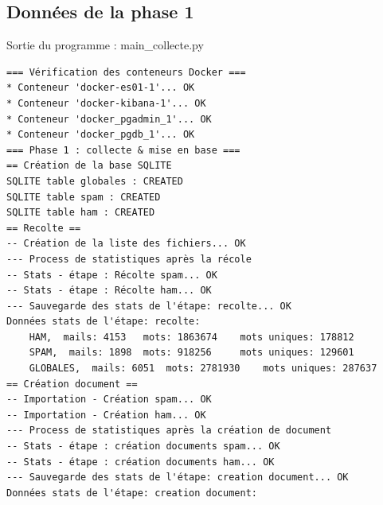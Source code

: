 \documentclass[a4paper,12pt]{article}
\begin{document}
	\subsection{Données de la phase 1}
		Sortie du programme : main\_collecte.py
		\begin{verbatim}
=== Vérification des conteneurs Docker ===
* Conteneur 'docker-es01-1'... OK
* Conteneur 'docker-kibana-1'... OK
* Conteneur 'docker_pgadmin_1'... OK
* Conteneur 'docker_pgdb_1'... OK
=== Phase 1 : collecte & mise en base ===
== Création de la base SQLITE
SQLITE table globales : CREATED
SQLITE table spam : CREATED
SQLITE table ham : CREATED
== Recolte ==
-- Création de la liste des fichiers... OK
--- Process de statistiques après la récole
-- Stats - étape : Récolte spam... OK                                                                                                                                                                                                         
-- Stats - étape : Récolte ham... OK                                                                                                                                                                                                          
--- Sauvegarde des stats de l'étape: recolte... OK
Données stats de l'étape: recolte:
	HAM,  mails: 4153 	mots: 1863674	 mots uniques: 178812
	SPAM,  mails: 1898 	mots: 918256	 mots uniques: 129601
	GLOBALES,  mails: 6051 	mots: 2781930	 mots uniques: 287637
== Création document ==
-- Importation - Création spam... OK                                                                                                                                                                                                          
-- Importation - Création ham... OK                                                                                                                                                                                                           
--- Process de statistiques après la création de document
-- Stats - étape : création documents spam... OK                                                                                                                                                                                              
-- Stats - étape : création documents ham... OK                                                                                                                                                                                               
--- Sauvegarde des stats de l'étape: creation document... OK
Données stats de l'étape: creation document:

\end{verbatim}
\end{document}
